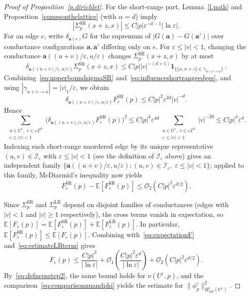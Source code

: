 \documentclass[11pt]{amsart}
\theoremstyle{plain}
\theoremstyle{definition}
\theoremstyle{remark}
\newcommand{\E}{\mathbb{E}}
\newcommand{\Zd}{\mathbb{Z}^d}
\renewcommand{\a}{\mathbf{a}}
\newcommand{\eps}{\varepsilon}
\begin{document}
\begin{proof}[Proof of Proposition~\ref{p.dirichlet}]
		For the short-range part, Lemma~\ref{l.path} and Proposition~\ref{sumesonthelattice} (with $\alpha = d$) imply
		\begin{equation} \label{eq:upperboundsigmaSR}
			|\Sigma_p^{\mathrm{SR}}(x+z,x)| \le C|p|\eps^{-d-1}|\ln\eps|.
		\end{equation}
		For an edge $e$, write $\delta_{\a(e)} G$ for the supremum of $|G(\a) - G(\a')|$ over conductance configurations $\a,\a'$ differing only on $e$.
		For $\eps \le |v| < 1$, changing the conductance $\a((u+v)/\eps, u/\eps)$ changes $\Sigma_p^{\mathrm{SR}}(x+z,x)$ by at most
		\begin{equation} \label{eq:influenceshortrangeedges}
			\delta_{\a((u+v)/\eps, u/\eps)} \Sigma_p^{\mathrm{SR}}(x+z,x) \le C|p||v|^{-(d+1)} \mathbf{1}_{\{\{x,x+z\} \in \gamma_{u+v \to u}\}}\,.
		\end{equation}
		Combining~\eqref{eq:upperboundsigmaSR} and~\eqref{eq:influenceshortrangeedges}, and using $|\gamma_{u+v \to u}| = |v|_1/\eps$, we obtain
		\[
		\delta_{\a((u+v)/\eps, u/\eps)} F_\eps^{\mathrm{SR}}(p) \le C|p|^2\eps^{2d}|v|^{-d}.
		\]
		Hence
		\[
		\sum_{\substack{u \in U^\eps,\; v \in \eps\Zd \\ \eps \le |v| < 1}} \bigl(\delta_{\a((u+v)/\eps, u/\eps)} F_\eps^{\mathrm{SR}}(p)\bigr)^2 \le C|p|^4\eps^{4d} \sum_{\substack{u \in U^\eps,\; v \in \eps\Zd \\ \eps \le |v| < 1}} |v|^{-2d} \le C|p|^4\eps^d.
		\]
		Indexing each short-range unordered edge by its unique representative $(u,v) \in \mathcal{I}_\eps$ with $\eps \le |v| < 1$ (see the definition of $\mathcal{I}_\eps$ above) gives an independent family $\{\a((u+v)/\eps, u/\eps) : (u,v) \in \mathcal{I}_\eps,\; \eps \le |v| < 1\}$; applied to this family, McDiarmid's inequality now yields
		\[
		F_\eps^{\mathrm{SR}}(p) - \E[F_\eps^{\mathrm{SR}}(p)] \le \mathcal{O}_2(C|p|^2\eps^{d/2}).
		\]
		
		Since $\Sigma_p^{\mathrm{SR}}$ and $\Sigma_p^{\mathrm{LR}}$ depend on disjoint families of conductances (edges with $|v| < 1$ and $|v| \ge 1$ respectively), the cross terms vanish in expectation, so $\E[F_\eps(p)] = \E[F_\eps^{\mathrm{SR}}(p)] + \E[F_\eps^{\mathrm{LR}}(p)]$.
		In particular, $\E[F_\eps^{\mathrm{SR}}(p)] \le \E[F_\eps(p)]$.
		Combining with~\eqref{eq:expectationF} and~\eqref{eq:estimateLRterm} gives
		\[
		F_\eps(p) \le \frac{C|p|^2}{|\ln\eps|} + \mathcal{O}_1\left(\frac{C|p|^2\eps^d}{|\ln\eps|}\right) + \mathcal{O}_2(C|p|^2\eps^{d/2}).
		\]
		By~\eqref{eq:defnepsstep2}, the same bound holds for $\nu(U^\eps, p)$, and the comparison~\eqref{eq:comparisonnuandphi} yields the estimate for $\|\phi_p^\eps\|_{H^1_{\mathrm{crit}}(U^\eps)}^2$.
	\end{proof}
	
\end{document}

